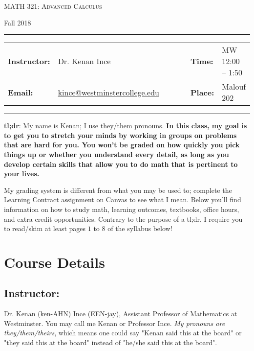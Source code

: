 \documentclass[11pt, a4paper]{article}
\begin{document}
\begin{center}
{\Large \textsc{MATH 321: Advanced Calculus}}
\end{center}
\begin{center}
Fall 2018
\end{center}

\begin{center}
\rule{6in}{0.4pt}
\begin{minipage}[t]{.75\textwidth}
\begin{tabular}{llcccll}
\textbf{Instructor:} & Dr. Kenan Ince & & &  & \textbf{Time:} & MW 12:00 -- 1:50 \\
\textbf{Email:} &  \href{mailto:kince@westminstercollege.edu}{kince@westminstercollege.edu} & & & & \textbf{Place:} & Malouf 202
\end{tabular}
\end{minipage}
\rule{6in}{0.4pt}
\end{center}
\vspace{.5cm}
\setlength{\unitlength}{1in}
\renewcommand{\arraystretch}{2}

\textbf{tl;dr}: My name is Kenan; I use they/them pronouns. \textbf{In this class, my goal is to get you to stretch your minds by working in groups on problems that are hard for you. You won't be graded on how quickly you pick things up or whether you understand every detail, as long as you develop certain skills that allow you to do math that is pertinent to your lives.}

My grading system is different from what you may be used to; complete the Learning Contract assignment on Canvas to see what I mean. Below you'll find information on how to study math, learning outcomes, textbooks, office hours, and extra credit opportunities. Contrary to the purpose of a tl;dr, I require you to read/skim at least pages $1$ to $8$ of the syllabus below!

\section*{Course Details}
\subsection*{Instructor:} Dr. Kenan (ken-AHN) Ince (EEN-jay), Assistant Professor of Mathematics at Westminster. You may call me Kenan or Professor Ince. \textit{My pronouns are they/them/theirs}, which means one could say "Kenan said this at the board" or "they said this at the board" instead of "he/she said this at the board".
\end{document}
